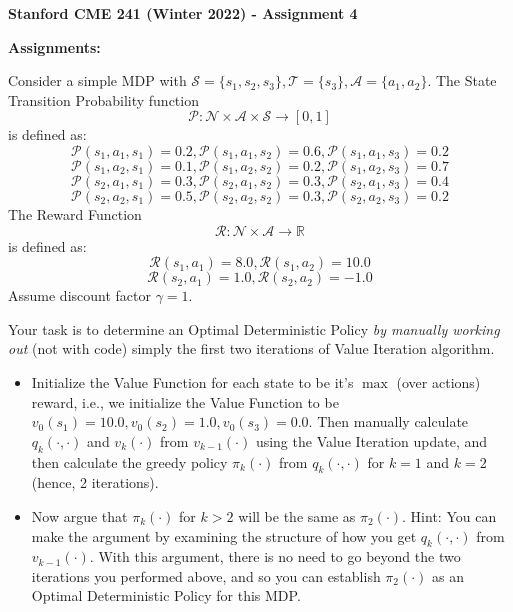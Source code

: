 \documentclass[12pt]{exam}
\begin{document}
\begin{center}
{\large {\bf Stanford CME 241 (Winter 2022) - Assignment 4}}
\end{center}
 
{\large{\bf Assignments:}}
\begin{questions}
 Consider a simple MDP with $\mathcal{S} = \{s_1, s_2, s_3\}, \mathcal{T} =\{s_3\}, \mathcal{A} = \{a_1, a_2\}$. The State Transition Probability function
$$\mathcal{P}: \mathcal{N} \times \mathcal{A} \times \mathcal{S} \rightarrow [0, 1]$$
is defined as:
$$\mathcal{P}(s_1, a_1, s_1) = 0.2, \mathcal{P}(s_1, a_1, s_2) = 0.6, \mathcal{P}(s_1, a_1, s_3) = 0.2$$
$$\mathcal{P}(s_1, a_2, s_1) = 0.1, \mathcal{P}(s_1, a_2, s_2) = 0.2, \mathcal{P}(s_1, a_2, s_3) = 0.7$$
$$\mathcal{P}(s_2, a_1, s_1) = 0.3, \mathcal{P}(s_2, a_1, s_2) = 0.3, \mathcal{P}(s_2, a_1, s_3) = 0.4$$
$$\mathcal{P}(s_2, a_2, s_1) = 0.5, \mathcal{P}(s_2, a_2, s_2) = 0.3, \mathcal{P}(s_2, a_2, s_3) = 0.2$$
The Reward Function 
$$\mathcal{R}: \mathcal{N} \times \mathcal{A} \rightarrow \mathbb{R}$$
is defined as:
$$\mathcal{R}(s_1, a_1) = 8.0, \mathcal{R}(s_1, a_2) = 10.0$$
$$\mathcal{R}(s_2, a_1) = 1.0, \mathcal{R}(s_2, a_2) = -1.0$$
Assume discount factor $\gamma = 1$.

Your task is to determine an Optimal Deterministic Policy {\em by manually working out} (not with code) simply the first two iterations of Value Iteration algorithm. 

\begin{itemize}
\item Initialize the Value Function for each state to be it's $\max$ (over actions) reward, i.e., we initialize the Value Function to be $v_0(s_1) = 10.0, v_0(s_2) = 1.0, v_0(s_3) = 0.0$. Then manually calculate $q_k(\cdot, \cdot)$ and $v_k(\cdot)$ from $v_{k - 1}( \cdot)$ using the Value Iteration update, and then calculate the greedy policy $\pi_k(\cdot)$ from $q_k(\cdot, \cdot)$ for $k = 1$ and $k = 2$ (hence, 2 iterations).

\item Now argue that $\pi_k(\cdot)$ for $k > 2$ will be the same as $\pi_2(\cdot)$. Hint: You can make the argument by examining the structure of how you get $q_k(\cdot, \cdot)$ from $v_{k-1}(\cdot)$. With this argument, there is no need to go beyond the two iterations you performed above, and so you can establish $\pi_2(\cdot)$ as an Optimal Deterministic Policy for this MDP.
\end{itemize}



\end{questions}
\end{document}
